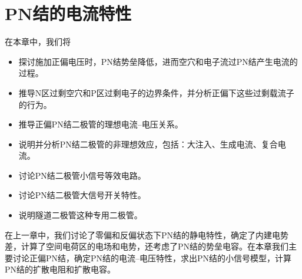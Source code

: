 \chapter{PN结的电流特性}
在本章中，我们将
\begin{itemize}
    \item 探讨施加正偏电压时，PN结势垒降低，进而空穴和电子流过PN结产生电流的过程。
    \item 推导N区过剩空穴和P区过剩电子的边界条件，并分析正偏下这些过剩载流子的行为。
    \item 推导正偏PN结二极管的理想电流--电压关系。
    \item 说明并分析PN结二极管的非理想效应，包括：大注入、生成电流、复合电流。
    \item 讨论PN结二极管小信号等效电路。
    \item 讨论PN结二极管大信号开关特性。
    \item 说明隧道二极管这种专用二极管。
\end{itemize}
在上一章中，我们讨论了零偏和反偏状态下PN结的静电特性，确定了内建电势差，计算了空间电荷区的电场和电势，还考虑了PN结的势垒电容。在本章我们主要讨论正偏PN结，确定PN结的电流--电压特性，求出PN结的小信号模型，计算PN结的扩散电阻和扩散电容。




